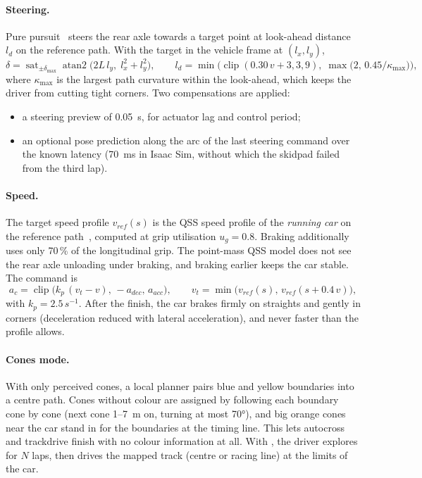 \documentclass[11pt]{article}
\begin{document}
\paragraph{Steering.} Pure pursuit~\cite{coulter1992} steers the rear axle towards a target point at look-ahead
distance $l_d$ on the reference path. With the target in the vehicle frame at $(l_x, l_y)$,
\begin{equation}
\delta = \operatorname{sat}_{\pm\delta_{\max}}\operatorname{atan2}\!\big(2L\,l_y,\; l_x^2 + l_y^2\big),\qquad
l_d = \min\!\Big(\operatorname{clip}(0.30\,v + 3, 3, 9),\; \max\big(2,\, 0.45/\kappa_{\max}\big)\Big),
\label{eq:pp}
\end{equation}
where $\kappa_{\max}$ is the largest path curvature within the look-ahead, which keeps the driver from cutting
tight corners. Two compensations are applied:
\begin{itemize}
  \item a steering preview of \SI{0.05}{s}, for actuator lag and control period;
  \item an optional pose prediction along the arc of the last steering command over the known latency
        (\SI{70}{ms} in Isaac Sim, without which the skidpad failed from the third lap).
\end{itemize}

\paragraph{Speed.} The target speed profile $v_{ref}(s)$ is the QSS speed profile of the \emph{running car} on the
reference path~\cite{perflab}, computed at grip utilisation $u_g=0.8$. Braking additionally uses only 70\,\% of the
longitudinal grip. The point-mass QSS model does not see the rear axle unloading under braking, and braking earlier
keeps the car stable. The command is
\begin{equation}
a_c = \operatorname{clip}\big(k_p\,(v_t - v),\, -a_{dec},\, a_{acc}\big),\qquad
v_t = \min\big(v_{ref}(s),\, v_{ref}(s + 0.4\,v)\big),
\end{equation}
with $k_p=2.5\,\si{s^{-1}}$. After the finish, the car brakes firmly on straights and gently in corners
(deceleration reduced with lateral acceleration), and never faster than the profile allows.

\paragraph{Cones mode.} With only perceived cones, a local planner pairs blue and yellow boundaries into a centre
path. Cones without colour are assigned by following each boundary cone by cone (next cone 1--\SI{7}{m} on, turning
at most \ang{70}), and big orange cones near the car stand in for the boundaries at the timing line. This lets
autocross and trackdrive finish with no colour information at all. With , the driver explores
for $N$ laps, then drives the mapped track (centre or racing line) at the limits of the car.
\end{document}
